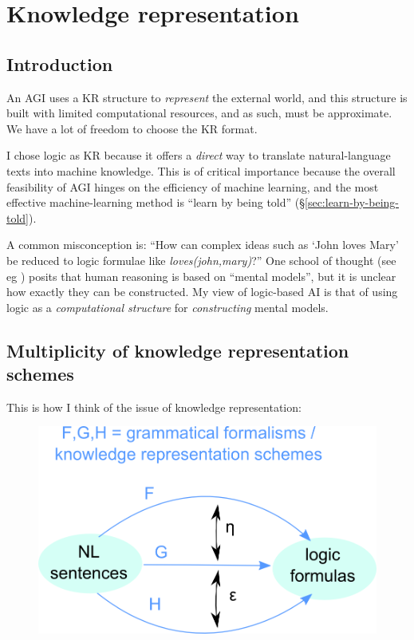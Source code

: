 \chapter{Knowledge representation}
\minitoc

\section{Introduction}

An AGI uses a KR structure to \textit{represent} the external world, and this structure is built with limited computational resources, and as such, must be approximate.  We have a lot of freedom to choose the KR format.

I chose logic as KR because it offers a \textit{direct} way to translate natural-language texts into machine knowledge.  This is of critical importance because the overall feasibility of AGI hinges on the efficiency of machine learning, and the most effective machine-learning method is ``learn by being told'' (\S\ref{sec:learn-by-being-told}).

A common misconception is:  ``How can complex ideas such as `John loves Mary' be reduced to logic formulae like \textit{loves(john,mary)}?''  One school of thought (see eg \citep*{Johnson-Laird1983}) posits that human reasoning is based on ``mental models'', but it is unclear how exactly they can be constructed.  My view of logic-based AI is that of using logic as a \textit{computational structure} for \textit{constructing} mental models.


\section{Multiplicity of knowledge representation schemes}

This is how I think of the issue of knowledge representation:\\
\begin{figure}[H]
\centering
\includegraphics[scale=0.7]{KR-functors.png}
\end{figure}

